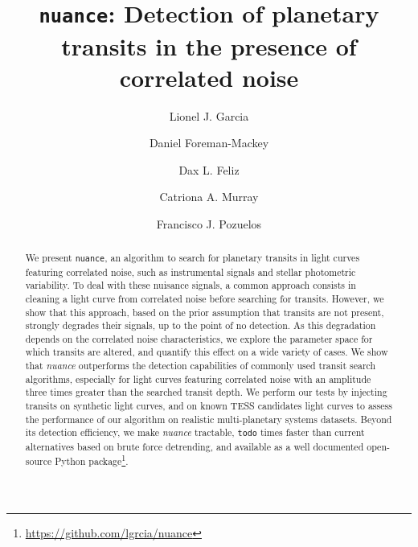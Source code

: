 \documentclass{aastex631}
\newcommand{\nuancemethod}{\textit{nuance}}
\newcommand{\nuance}{\nuancemethod{}}
\newcommand{\TODO}{\texttt{todo}}
\begin{document}
\title{\texttt{nuance}: Detection of planetary transits in the presence of correlated noise}

\author{Lionel J. Garcia}
\author{Daniel Foreman-Mackey}
\author{Dax L. Feliz}
\author{Catriona A. Murray}
\author{Francisco J. Pozuelos}

\begin{abstract}
    We present \texttt{nuance}, an algorithm to search for planetary transits in light curves featuring correlated noise, such as instrumental signals and stellar photometric variability. To deal with these nuisance signals, a common approach consists in cleaning a light curve from correlated noise before searching for transits. However, we show that this approach, based on the prior assumption that transits are not present, strongly degrades their signals, up to the point of no detection. As this degradation depends on the correlated noise characteristics, we explore the parameter space for which transits are altered, and quantify this effect on a wide variety of cases. We show that \nuance{} outperforms the detection capabilities of commonly used transit search algorithms, especially for light curves featuring correlated noise with an amplitude three times greater than the searched transit depth. We perform our tests by injecting transits on synthetic light curves, and on known TESS candidates light curves to assess the performance of our algorithm on realistic multi-planetary systems datasets. Beyond its detection efficiency, we make \nuance{} tractable, \TODO{} times faster than current alternatives based on brute force detrending, and available as a well documented open-source Python package\footnote{\href{https://github.com/lgrcia/nuance}{https://github.com/lgrcia/nuance}}.
\end{abstract}
\end{document}
